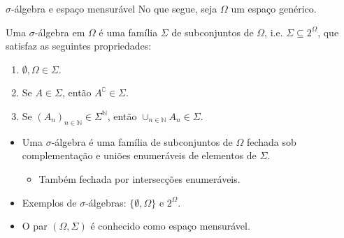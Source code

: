 \documentclass[11pt]{beamer}
\begin{document}
\begin{frame}{$\sigma$-álgebra e espaço mensurável}
	No que segue, seja $\Omega$ um espaço genérico.
\begin{definition}
	Uma $\sigma$-álgebra em $\Omega$ é uma família $\Sigma$ de subconjuntos de  $\Omega$, i.e. $\Sigma \subseteq 2^\Omega$, que satisfaz as seguintes propriedades:
	\begin{enumerate}
		\item $\emptyset, \Omega \in \Sigma$.
		\item Se $A \in \Sigma$, então $A^\complement \in \Sigma$.
		\item Se $(A_n)_{n \in \mathbb{N} }\in \Sigma^\mathbb{N}$, então $\cup_{n \in \mathbb{N}}A_n \in \Sigma$. 
	\end{enumerate}

\end{definition}
\vspace{1em}
\begin{itemize}
	\item 	Uma $\sigma$-álgebra é uma família de subconjuntos de  $\Omega$ fechada sob complementação e uniões enumeráveis de elementos de $\Sigma$.
	\begin{itemize}
		\item Também fechada por intersecções enumeráveis.
	\end{itemize}
	\item Exemplos de $\sigma$-álgebras: $\{\emptyset, \Omega\}$ e $2^\Omega$.
	\item O par $(\Omega, \Sigma)$ é conhecido como {\color{blue}espaço mensurável}.
\end{itemize}

\end{frame}
\end{document}
